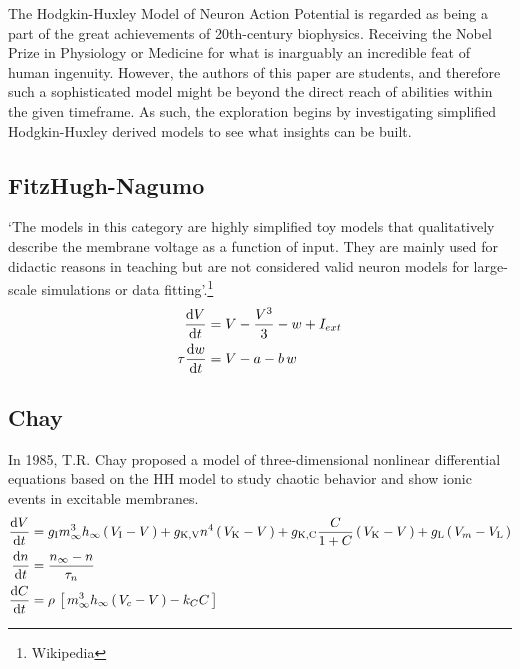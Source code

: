 \documentclass[../../Orator.tex]{subfiles}
\begin{document}
The Hodgkin-Huxley Model of Neuron Action Potential is regarded as being a part of the great achievements of 20th-century biophysics. Receiving the Nobel Prize in Physiology or Medicine for what is inarguably an incredible feat of human ingenuity. However, the authors of this paper are students, and therefore such a sophisticated model might be beyond the direct reach of abilities within the given timeframe. 
As such, the exploration begins by investigating simplified Hodgkin-Huxley derived models to see what insights can be built.

\subsection{FitzHugh-Nagumo}
`The models in this category are highly simplified toy models that qualitatively describe the membrane voltage as a function of input. They are mainly used for didactic reasons in teaching but are not considered valid neuron models for large-scale simulations or data fitting'.\footnote{Wikipedia} 
\begin{subequations}\label{eq:FitNagSys}
    \begin{align}
        \frac{\mathrm{d}\displaystyle V}{\mathrm{d}\displaystyle t} &= V - \frac{V^3}{3} - w + I_{ext} \\ 
        \tau\frac{\mathrm{d}\displaystyle w}{\mathrm{d}\displaystyle t} &= V - a - b\,w 
    \end{align}
\end{subequations}


\subsection{Chay}
In 1985, T.R. Chay proposed a model of three-dimensional nonlinear differential equations based on the HH model to study chaotic behavior and show ionic events in excitable membranes. 
\begin{subequations}\label{eq:ChaySys}
    \begin{align}
        \frac{\mathrm{d}\displaystyle V}{\mathrm{d}\displaystyle t} &= g_{\mathrm{I}}  m^3_\infty h_\infty \left(\,V_{\mathrm{I}} - V\,\right) + g_{\mathrm{K, V}} n^4 \left(\,V_{\mathrm{K}} - V\,\right) + g_{\mathrm{K, C}}  \frac{C}{1+C}\left(\,V_{\mathrm{K}} - V\,\right) + g_{\mathrm{L}} \left(\,V_m - V_{\mathrm{L}}\,\right) \\ 
        \frac{\mathrm{d}\displaystyle n}{\mathrm{d}\displaystyle t} &= \frac{n_\infty - n}{\tau_n} \\
        \frac{\mathrm{d}\displaystyle C}{\mathrm{d}\displaystyle t} &= \rho \, \left[\,m^3_\infty h_\infty \left(\,V_c - V\,\right) - k_C C\,\right]
    \end{align}
\end{subequations}
\end{document}
